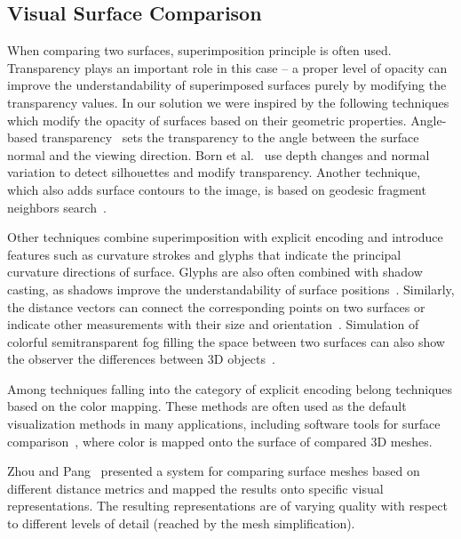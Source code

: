 \documentclass[final,5p,times]{elsarticle}
\begin{document}
\subsection{Visual Surface Comparison}
When comparing two surfaces, superimposition principle is often used.
Transparency plays an important role in this case -- a proper level of opacity can improve the understandability of superimposed surfaces purely by modifying the transparency values. 
In our solution we were inspired by the following techniques which modify the opacity of surfaces based on their geometric properties. 
Angle-based transparency~\cite{hummel2010iris} sets the transparency to the angle between the surface normal and the viewing direction. 
Born et al.~\cite{born2009illustrative} use depth changes and normal variation to detect silhouettes and modify transparency. 
Another technique, which also adds surface contours to the image, is based on geodesic fragment neighbors search~\cite{carnecky2013smart}. 

Other techniques \cite{interrante1997conveying,diewald2000anisotropic,weigle2005visualizing} combine superimposition with explicit encoding and introduce features such as curvature strokes and glyphs that indicate the principal curvature directions of surface. 
Glyphs are also often combined with shadow casting, as shadows improve the understandability of surface positions~\cite{weigle2005visualizing}. 
Similarly, the distance vectors can connect the corresponding points on two surfaces or indicate other measurements with their size and orientation~\cite{busking2011image}. 
Simulation of colorful semitransparent fog filling the space between two surfaces can also show the observer the differences between 3D objects~\cite{busking2011image}.

Among techniques falling into the category of explicit encoding belong techniques based on the color mapping. 
These methods are often used as the default visualization methods in many applications, including software tools for surface comparison~\cite{CCompare,ymca}, where color is mapped onto the surface of compared 3D meshes. 

Zhou and Pang~\cite{Zhou2001} presented a system for comparing surface meshes based on different distance metrics and mapped the results onto specific visual representations.
The resulting representations are of varying quality with respect to different levels of detail (reached by the mesh simplification).
\end{document}
